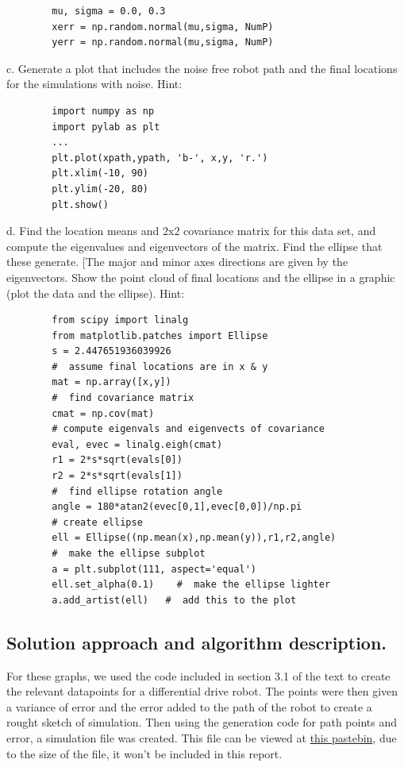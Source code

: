 \documentclass[letterpaper,11pt]{texMemo} %
\begin{document}
\begin{tiny}
    \begin{lstlisting}
        mu, sigma = 0.0, 0.3
        xerr = np.random.normal(mu,sigma, NumP)
        yerr = np.random.normal(mu,sigma, NumP)
    \end{lstlisting}
\end{tiny}

c. Generate a plot that includes the noise free robot path and the final locations for the
simulations with noise. Hint:

\begin{tiny}
    \begin{lstlisting}
        import numpy as np
        import pylab as plt
        ...
        plt.plot(xpath,ypath, 'b-', x,y, 'r.')
        plt.xlim(-10, 90)
        plt.ylim(-20, 80)
        plt.show()
    \end{lstlisting}
\end{tiny}

d. Find the location means and 2x2 covariance matrix for this data set, and compute the eigenvalues
and eigenvectors of the matrix. Find the ellipse that these generate. [The major and minor axes
directions are given by the eigenvectors. Show the point cloud of final locations and the ellipse 
in a graphic (plot the data and the ellipse). Hint:

\begin{tiny}
    \begin{lstlisting}
        from scipy import linalg
        from matplotlib.patches import Ellipse
        s = 2.447651936039926
        #  assume final locations are in x & y
        mat = np.array([x,y])
        #  find covariance matrix
        cmat = np.cov(mat)
        # compute eigenvals and eigenvects of covariance
        eval, evec = linalg.eigh(cmat)
        r1 = 2*s*sqrt(evals[0])
        r2 = 2*s*sqrt(evals[1])
        #  find ellipse rotation angle
        angle = 180*atan2(evec[0,1],evec[0,0])/np.pi
        # create ellipse
        ell = Ellipse((np.mean(x),np.mean(y)),r1,r2,angle)
        #  make the ellipse subplot
        a = plt.subplot(111, aspect='equal')
        ell.set_alpha(0.1)    #  make the ellipse lighter
        a.add_artist(ell)   #  add this to the plot
    \end{lstlisting}
\end{tiny}

\subsection*{Solution approach and algorithm description.}
For these graphs, we used the code included in section 3.1 of the text to create the relevant
datapoints for a differential drive robot. The points were then given a variance of error and the 
error added to the path of the robot to create a rought sketch of simulation. Then using the generation 
code for path points and error, a simulation file was created. This file can be viewed at \href{https://pastebin.com/f6VpHfQk}{this pastebin},
due to the size of the file, it won't be included in this report.
\end{document}
